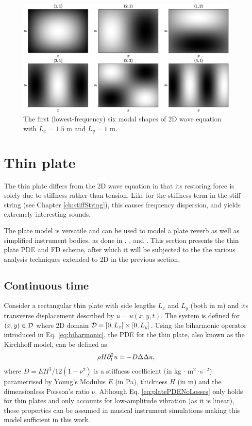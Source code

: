 \begin{figure}[h]
    \centering
    \includegraphics[width=\textwidth]{figures/resonators/2d/modalShapes.eps}
    \caption{The first (lowest-frequency) six modal shapes of 2D wave equation with $L_x = 1.5$ m and $L_y = 1$ m.%
    \label{fig:modalShapes2D}}
\end{figure}

\section{Thin plate}\label{sec:thinPlate}
The thin plate differs from the 2D wave equation in that its restoring force is solely due to stiffness rather than tension. Like for the stiffness term in the stiff string (see Chapter \ref{ch:stiffString}), this causes frequency dispersion, and yields extremely interesting sounds. 

The plate model is versatile and can be used to model a plate reverb \cite{DAFxChapter} as well as simplified instrument bodies, as done in \citeP[A], \citeP[B], \citeP[D] and \citeP[E]. This section presents the thin plate PDE and FD scheme, after which it will be subjected to the the various analysis techniques extended to 2D in the previous section.

\subsection{Continuous time}
Consider a rectangular thin plate with side lengths $L_x$ and $L_y$ (both in m) and its transverse displacement described by $u=u(x,y,t)$. The system is defined for $(x,y)\in \mathcal{D}$ where 2D domain $\mathcal{D} = [0, L_x]\times [0, L_y]$. Using the biharmonic operator introduced in Eq. \eqref{eq:biharmonic}, the PDE for the thin plate, also known as the Kirchhoff model, can be defined as \cite{Kirchhoff1968}
\begin{equation}\label{eq:platePDENoLosses}
    \rho H \partial_t^2 u = -D\Delta\Delta u,
\end{equation}
where $D = EH^3/12(1-\nu^2)$ is a stiffness coefficient (in kg $\cdot$ m$^2\cdot$s$^{-2}$) parametrised by Young's Modulus $E$ (in Pa), thickness $H$ (in m) and the dimensionless Poisson's ratio $\nu$. Although Eq. \eqref{eq:platePDENoLosses} only holds for thin plates and only accounts for low-amplitude vibration (as it is linear), these properties can be assumed in musical instrument simulations making this model sufficient in this work. 

